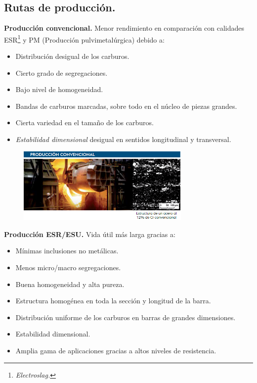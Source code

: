 \documentclass[12pt,a4paper]{article}
\begin{document}
\subsection{Rutas de producción.}
\textbf{Producción convencional.} Menor rendimiento en comparación con calidades ESR\footnote{\textit{Electroslag.}} y PM (Producción pulvimetalúrgica) debido a:
\begin{itemize}
    \item Distribución desigual de los carburos.
    \item Cierto grado de segregaciones.
    \item Bajo nivel de homogeneidad.
    \item Bandas de carburos marcadas, sobre todo en el núcleo de piezas grandes.
    \item Cierta variedad en el tamaño de los carburos.
    \item \textit{Estabilidad dimensional} desigual en sentidos longitudinal y transversal.
\end{itemize}
\begin{figure}[H]    
    \centering         
    \includegraphics[width=0.75\textwidth]{Inagenes para latex/7.png}
\end{figure}
\textbf{Producción ESR/ESU.} Vida útil más larga gracias a:
\begin{itemize}
    \item Mínimas inclusiones no metálicas.
    \item Menos micro/macro segregaciones.
    \item Buena homogeneidad y alta pureza.
    \item Estructura homogénea en toda la sección y longitud de la barra.
    \item Distribución uniforme de los carburos en barras de grandes dimensiones.
    \item Estabilidad dimensional.
    \item Amplia gama de aplicaciones gracias a altos niveles de resistencia.
\end{itemize}
\end{document}
